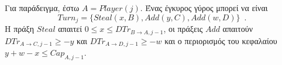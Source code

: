 Για παράδειγμα, έστω $A = Player(j)$. Ένας έγκυρος γύρος μπορεί να είναι
\begin{equation*}
  Turn_j = \{Steal\left(x, B\right), Add\left(y, C\right), Add\left(w, D\right)\} \enspace.
\end{equation*}
Η πράξη $Steal$ απαιτεί $0 \leq x \leq DTr_{B \rightarrow A, j-1}$, οι πράξεις $Add$ απαιτούν $DTr_{A \rightarrow C, j-1} \geq
-y$ και $DTr_{A \rightarrow D, j-1} \geq -w$ και ο περιορισμός του κεφαλαίου $y + w - x \leq Cap_{A, j-1}$.

